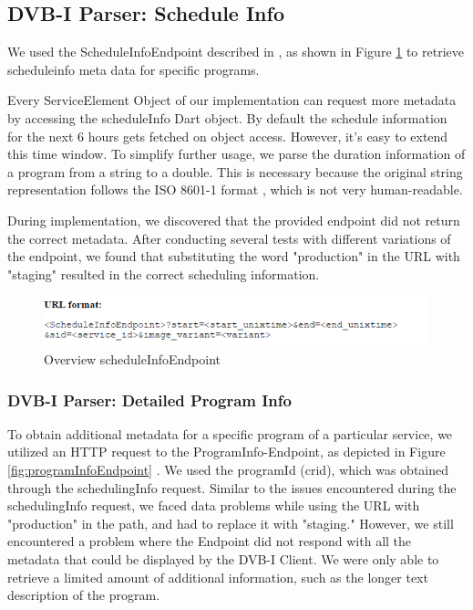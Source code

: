 \documentclass[conference]{IEEEtran}
\begin{document}
\subsection{DVB-I Parser: Schedule Info}

We used the ScheduleInfoEndpoint described in \cite{DVBI-I}, as shown in Figure \ref{fig:scheduleInfoEndpoint} to retrieve scheduleinfo meta data for specific programs.

Every ServiceElement Object of our implementation can request more metadata by accessing the scheduleInfo Dart object.
By default the schedule information for the next 6 hours gets fetched on object access.  However, it's easy to extend this time window. To simplify further usage, we parse the duration information of a program from a string to a double. This is necessary because the original string representation follows the ISO 8601-1 format \cite{iso2019}, which is not very human-readable.

During implementation, we discovered that the provided endpoint did not return the correct metadata. After conducting several tests with different variations of the endpoint, we found that substituting the word "production" in the URL with "staging" resulted in the correct scheduling information.



\begin{figure}[ht]
	\centerline{\includegraphics[width=\linewidth]{figures/scheduleInfoEndpointTime}}
	\caption{Overview scheduleInfoEndpoint \cite{DVBI-I}}
	\label{fig:scheduleInfoEndpoint}
\end{figure}



\subsubsection{DVB-I Parser: Detailed Program Info }



To obtain additional metadata for a specific program of a particular service, we utilized an HTTP request to the ProgramInfo-Endpoint, as depicted in Figure \ref{fig:programInfoEndpoint} . We used the programId (crid), which was obtained through the schedulingInfo request. Similar to the issues encountered during the schedulingInfo request, we faced data problems while using the URL with "production" in the path, and had to replace it with "staging." However, we still encountered a problem where the Endpoint did not respond with all the metadata that could be displayed by the DVB-I Client. We were only able to retrieve a limited amount of additional information, such as the longer text description of the program.
\end{document}
